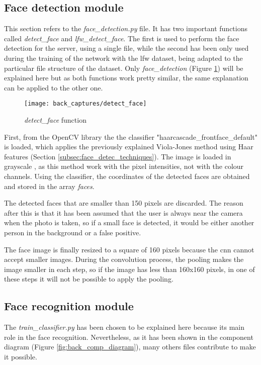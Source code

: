 	\subsection{Face detection module}
	\label{subsec:face_det}
	This section refers to the \textit{face{\_}detection.py} file. It has two important functions called \textit{detect{\_}face} and \textit{lfw{\_}detect{\_}face}. The first is used to perform the face detection for the server, using a single file, while the second has been only used during the training of the network with the \gls{lfw} dataset, being adapted to the particular file structure of the dataset. Only \textit{face{\_}detection} (Figure \ref{fig:detect_face_function}) will be explained here but as both functions work pretty similar, the same explanation can be applied to the other one.

	\begin{figure}[!ht]
		\centering
		\texttt{[image: back\_captures/detect\_face]}
		\caption{\textit{detect{\_}face} function}
		\label{fig:detect_face_function}
	\end{figure}

	First, from the OpenCV library the the classifier "haarcascade{\_}frontface{\_}default" is loaded, which applies the previously explained Viola-Jones method using Haar features (Section \ref{subsec:face_detec_techniques}). The image is loaded in grayscale , as this method work with the pixel intensities, not with the colour channels. Using the classifier, the coordinates of the detected faces are obtained and stored in the array \textit{faces}. 

	The detected faces that are smaller than 150 pixels are discarded. The reason after this is that it has been assumed that the user is always near the camera when the photo is taken, so if a small face is detected, it would be either another person in the background or a false positive.

	The face image is finally resized to a square of 160 pixels because the \gls{cnn} cannot accept smaller images. During the convolution process, the pooling makes the image smaller in each step, so if the image has less than 160x160 pixels, in one of these steps it will not be possible to apply the pooling.

	\subsection{Face recognition module}
	\label{subsec:face_recog}
	The \textit{train{\_}classifier.py} has been chosen to be explained here because its main role in the face recognition. Nevertheless, as it has been shown in the component diagram (Figure \ref{fig:back_comp_diagram}), many others files contribute to make it possible.

